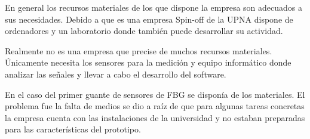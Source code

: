 	En general los recursos materiales de los que dispone la empresa son adecuados a sus necesidades. Debido a que es una empresa Spin-off de la UPNA dispone de ordenadores y un laboratorio donde también puede desarrollar su actividad. 
	
	Realmente no es una empresa que precise de muchos recursos materiales. Únicamente necesita los sensores para la medición y equipo informático donde analizar las señales y llevar a cabo el desarrollo del software.
	
	En el caso del primer guante de sensores de FBG se disponía de los materiales. El problema fue la falta de medios se dio a raíz de que para algunas tareas concretas la empresa cuenta con las instalaciones de la universidad y no estaban preparadas para las características del prototipo.
	